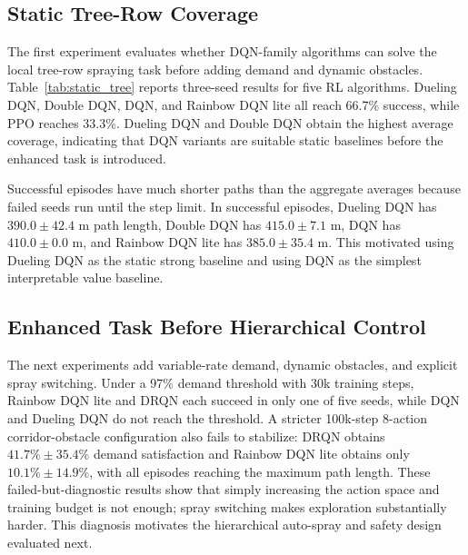 \documentclass[conference,10pt]{IEEEtran}
\begin{document}
\subsection{Static Tree-Row Coverage}
The first experiment evaluates whether DQN-family algorithms can solve the local tree-row spraying task before adding demand and dynamic obstacles. Table~\ref{tab:static_tree} reports three-seed results for five RL algorithms. Dueling DQN, Double DQN, DQN, and Rainbow DQN lite all reach 66.7\% success, while PPO reaches 33.3\%. Dueling DQN and Double DQN obtain the highest average coverage, indicating that DQN variants are suitable static baselines before the enhanced task is introduced.

\begin{table}[t]
\centering
\caption{Static tree-row coverage results over three seeds.}
\label{tab:static_tree}
\end{table}

Successful episodes have much shorter paths than the aggregate averages because failed seeds run until the step limit. In successful episodes, Dueling DQN has $390.0\pm42.4$ m path length, Double DQN has $415.0\pm7.1$ m, DQN has $410.0\pm0.0$ m, and Rainbow DQN lite has $385.0\pm35.4$ m. This motivated using Dueling DQN as the static strong baseline and using DQN as the simplest interpretable value baseline.

\subsection{Enhanced Task Before Hierarchical Control}
The next experiments add variable-rate demand, dynamic obstacles, and explicit spray switching. Under a 97\% demand threshold with 30k training steps, Rainbow DQN lite and DRQN each succeed in only one of five seeds, while DQN and Dueling DQN do not reach the threshold. A stricter 100k-step 8-action corridor-obstacle configuration also fails to stabilize: DRQN obtains $41.7\%\pm35.4\%$ demand satisfaction and Rainbow DQN lite obtains only $10.1\%\pm14.9\%$, with all episodes reaching the maximum path length. These failed-but-diagnostic results show that simply increasing the action space and training budget is not enough; spray switching makes exploration substantially harder. This diagnosis motivates the hierarchical auto-spray and safety design evaluated next.
\end{document}
